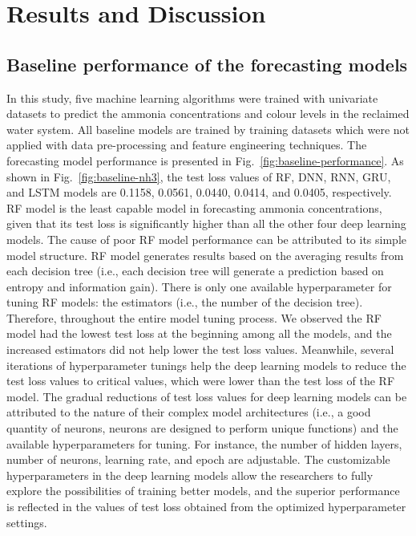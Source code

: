 \chapter{Results and Discussion}
\section{Baseline performance of the forecasting models}
In this study, five machine learning algorithms were trained with univariate datasets to predict the ammonia concentrations and colour levels in the reclaimed water system. All baseline models are trained by training datasets which were not applied with data pre-processing and feature engineering techniques. The forecasting model performance is presented in Fig.~\ref{fig:baseline-performance}. As shown in Fig.~\ref{fig:baseline-nh3}, the test loss values of RF, DNN, RNN, GRU, and LSTM models are 0.1158, 0.0561, 0.0440, 0.0414, and 0.0405, respectively. RF model is the least capable model in forecasting ammonia concentrations, given that its test loss is significantly higher than all the other four deep learning models. The cause of poor RF model performance can be attributed to its simple model structure. RF model generates results based on the averaging results from each decision tree (i.e., each decision tree will generate a prediction based on entropy and information gain). There is only one available hyperparameter for tuning RF models: the estimators (i.e., the number of the decision tree). Therefore, throughout the entire model tuning process. We observed the RF model had the lowest test loss at the beginning among all the models, and the increased estimators did not help lower the test loss values. Meanwhile, several iterations of hyperparameter tunings help the deep learning models to reduce the test loss values to critical values, which were lower than the test loss of the RF model. The gradual reductions of test loss values for deep learning models can be attributed to the nature of their complex model architectures (i.e., a good quantity of neurons, neurons are designed to perform unique functions) and the available hyperparameters for tuning. For instance, the number of hidden layers, number of neurons, learning rate, and epoch are adjustable. The customizable hyperparameters in the deep learning models allow the researchers to fully explore the possibilities of training better models, and the superior performance is reflected in the values of test loss obtained from the optimized hyperparameter settings.
